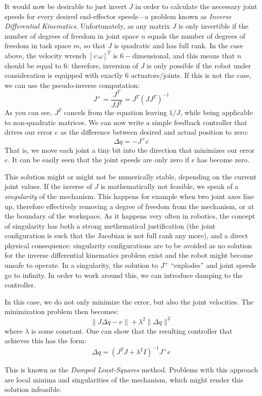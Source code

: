 It would now be desirable to just invert $J$ in order to calculate the necessary joint speeds for every desired end-effector speeds---a problem known as \emph{Inverse Differential Kinematics}. Unfortunately, as any matrix $J$ is only invertible if the number of degrees of freedom in joint space $n$ equals the number of degrees of freedom in task space $m$, so that $ J$ is quadratic and has full rank.
In the case above, the velocity wrench $[v \ \omega]^T$ is $6-$dimensional, and this means that $n$ should be equal to $6$: therefore, inversion of $J$ is only possible if the robot under consideration is equipped with exactly $6$ actuators/joints.
If this is not the case, we can use the pseudo-inverse computation:
\begin{equation}
J^+=\frac{J^T}{JJ^T}=J^T(JJ^T)^{-1}
\end{equation}
As you can see, $J^T$ cancels from the equation leaving $1/J$, while being applicable to non-quadratic matrices.
We can now write a simple feedback controller that drives our error $e$ as the difference between desired and actual position to zero:
\begin{equation}
\Delta{q}=-J^+e
\end{equation}
That is, we move each joint a tiny bit into the direction that minimizes our error $e$.
It can be easily seen that the joint speeds are only zero if $e$ has become zero.

This solution might or might not be numerically stable, depending on the current joint values. If the inverse of $J$ is mathematically not feasible, we speak of a \emph{singularity} of the mechanism. This happens for example when two joint axes line up, therefore effectively removing a degree of freedom from the mechanism, or at the boundary of the workspace. As it happens very often in robotics, the concept of singularity has both a strong methematical justification (the joint configuration is such that the Jacobian is not full rank any more), and a direct physical consequence: singularity configurations are to be avoided as no solution for the inverse differential kinematics problem exist and the robot might become unsafe to operate.
In a singularity, the solution to $ J^+$ ``explodes'' and joint speeds go to infinity. In order to work around this, we can introduce damping to the controller.

In this case, we do not only minimize the error, but also the joint velocities. The minimization problem then becomes:
\begin{equation}
\|J\Delta q-e\|+\lambda^2\|\Delta q\|^2
\end{equation}
where $\lambda$ is some constant. One can show that the resulting controller that achieves this has the form:
\begin{equation}
\Delta q=(J^TJ+\lambda^2 I)^{-1}J^+e
\end{equation}

This is known as the \emph{Damped Least-Squares} method. Problems with this approach are local minima and singularities of the mechanism, which might render this solution infeasible.

